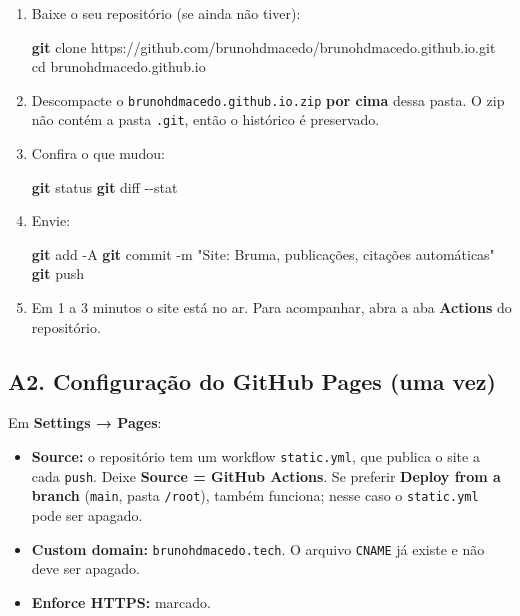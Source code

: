 \documentclass[
  10pt,
]{article}
\newenvironment{Shaded}{\begin{snugshade}}{\end{snugshade}}
\newcommand{\AttributeTok}[1]{\textcolor[rgb]{0.13,0.29,0.53}{#1}}
\newcommand{\BuiltInTok}[1]{#1}
\newcommand{\FunctionTok}[1]{\textcolor[rgb]{0.13,0.29,0.53}{\textbf{#1}}}
\newcommand{\NormalTok}[1]{#1}
\newcommand{\StringTok}[1]{\textcolor[rgb]{0.31,0.60,0.02}{#1}}
\providecommand{\tightlist}{%
  \setlength{\itemsep}{0pt}\setlength{\parskip}{0pt}}
\begin{document}
\begin{enumerate}
\def\labelenumi{\arabic{enumi}.}
\item
  Baixe o seu repositório (se ainda não tiver):

\begin{Shaded}
\begin{Highlighting}[]
\FunctionTok{git}\NormalTok{ clone https://github.com/brunohdmacedo/brunohdmacedo.github.io.git}
\BuiltInTok{cd}\NormalTok{ brunohdmacedo.github.io}
\end{Highlighting}
\end{Shaded}
\item
  Descompacte o
  \texttt{brunohdmacedo.\allowbreak{}github.\allowbreak{}io.\allowbreak{}zip}
  \textbf{por cima} dessa pasta. O zip não contém a pasta
  \texttt{.\allowbreak{}git}, então o histórico é preservado.
\item
  Confira o que mudou:

\begin{Shaded}
\begin{Highlighting}[]
\FunctionTok{git}\NormalTok{ status}
\FunctionTok{git}\NormalTok{ diff }\AttributeTok{{-}{-}stat}
\end{Highlighting}
\end{Shaded}
\item
  Envie:

\begin{Shaded}
\begin{Highlighting}[]
\FunctionTok{git}\NormalTok{ add }\AttributeTok{{-}A}
\FunctionTok{git}\NormalTok{ commit }\AttributeTok{{-}m} \StringTok{"Site: Bruma, publicações, citações automáticas"}
\FunctionTok{git}\NormalTok{ push}
\end{Highlighting}
\end{Shaded}
\item
  Em 1 a 3 minutos o site está no ar. Para acompanhar, abra a aba
  \textbf{Actions} do repositório.
\end{enumerate}

\hypertarget{a2.-configurauxe7uxe3o-do-github-pages-uma-vez}{%
\subsection{A2. Configuração do GitHub Pages (uma
vez)}\label{a2.-configurauxe7uxe3o-do-github-pages-uma-vez}}

Em \textbf{Settings → Pages}:

\begin{itemize}
\tightlist
\item
  \textbf{Source:} o repositório tem um workflow
  \texttt{static.\allowbreak{}yml}, que publica o site a cada
  \texttt{push}. Deixe \textbf{Source = GitHub Actions}. Se preferir
  \textbf{Deploy from a branch} (\texttt{main}, pasta
  \texttt{/\allowbreak{}root}), também funciona; nesse caso o
  \texttt{static.\allowbreak{}yml} pode ser apagado.
\item
  \textbf{Custom domain:} \texttt{brunohdmacedo.\allowbreak{}tech}. O
  arquivo \texttt{CNAME} já existe e não deve ser apagado.
\item
  \textbf{Enforce HTTPS:} marcado.
\end{itemize}
\end{document}
